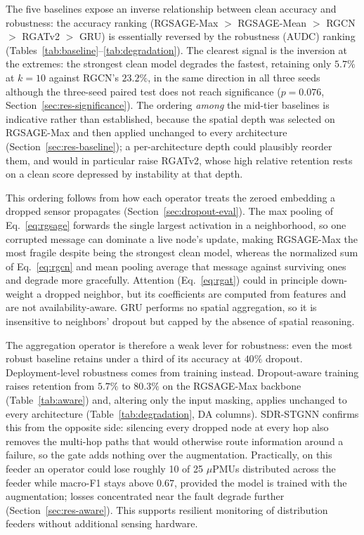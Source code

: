 \documentclass[3p,times,procedia]{elsarticle}
\begin{document}
The five baselines expose an inverse relationship between clean accuracy and robustness: the accuracy ranking (RGSAGE-Max $>$ RGSAGE-Mean $>$ RGCN $>$ RGATv2 $>$ GRU) is essentially reversed by the robustness (AUDC) ranking (Tables~\ref{tab:baseline}--\ref{tab:degradation}). The clearest signal is the inversion at the extremes: the strongest clean model degrades the fastest, retaining only $5.7\%$ at $k=10$ against RGCN's $23.2\%$, in the same direction in all three seeds although the three-seed paired test does not reach significance ($p=0.076$, Section~\ref{sec:res-significance}). The ordering \emph{among} the mid-tier baselines is indicative rather than established, because the spatial depth was selected on RGSAGE-Max and then applied unchanged to every architecture (Section~\ref{sec:res-baseline}); a per-architecture depth could plausibly reorder them, and would in particular raise RGATv2, whose high relative retention rests on a clean score depressed by instability at that depth.

This ordering follows from how each operator treats the zeroed embedding a dropped sensor propagates (Section~\ref{sec:dropout-eval}). The max pooling of Eq.~\eqref{eq:rgsage} forwards the single largest activation in a neighborhood, so one corrupted message can dominate a live node's update, making RGSAGE-Max the most fragile despite being the strongest clean model, whereas the normalized sum of Eq.~\eqref{eq:rgcn} and mean pooling average that message against surviving ones and degrade more gracefully. Attention (Eq.~\eqref{eq:rgat}) could in principle down-weight a dropped neighbor, but its coefficients are computed from features and are not availability-aware. GRU performs no spatial aggregation, so it is insensitive to neighbors' dropout but capped by the absence of spatial reasoning.

The aggregation operator is therefore a weak lever for robustness: even the most robust baseline retains under a third of its accuracy at $40\%$ dropout. Deployment-level robustness comes from training instead. Dropout-aware training raises retention from $5.7\%$ to $80.3\%$ on the RGSAGE-Max backbone (Table~\ref{tab:aware}) and, altering only the input masking, applies unchanged to every architecture (Table~\ref{tab:degradation}, DA columns). SDR-STGNN confirms this from the opposite side: silencing every dropped node at every hop also removes the multi-hop paths that would otherwise route information around a failure, so the gate adds nothing over the augmentation. Practically, on this feeder an operator could lose roughly 10 of 25 $\mu$PMUs distributed across the feeder while macro-F1 stays above $0.67$, provided the model is trained with the augmentation; losses concentrated near the fault degrade further (Section~\ref{sec:res-aware}). This supports resilient monitoring of distribution feeders without additional sensing hardware.
\end{document}
